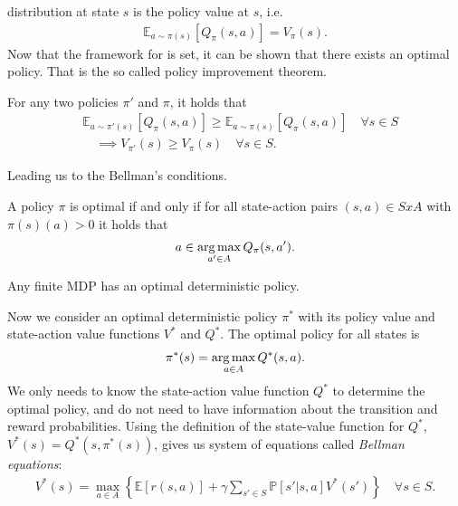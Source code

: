 distribution at state $s$ is the policy value at $s$, i.e.
\begin{align}
    \label{eq: state_value_expectation}
    \mathbb{E}_{a\sim\pi(s)}\left[Q_\pi(s, a)\right] = V_\pi(s).
\end{align}
Now that the framework for is set, it can be shown that there exists an
optimal policy. That is the so called policy improvement theorem.
\begin{theorem}
    For any two policies $\pi'$ and $\pi$, it holds that
    \begin{align}
         &\mathbb{E}_{a\sim\pi'(s)}\left[Q_\pi(s, a)\right]
        \ge \mathbb{E}_{a\sim\pi(s)}\left[Q_\pi(s, a)\right]  \quad \forall s \in S
        \\
         &\quad \implies  V_{\pi'}(s) \ge V_\pi (s) \quad
         \forall s \in S\nonumber.
    \end{align}
\end{theorem}
Leading us to the Bellman's conditions.
\begin{theorem}
    A policy $\pi$ is optimal if and only if for all state-action pairs
    $(s, a) \in S x A$ with $\pi(s)(a) > 0$ it holds that
    \begin{align}
        a \in \operatorname*{arg\,max}_{a'\in A} Q_\pi(s, a').
    \end{align}
\end{theorem}
\begin{theorem}
    Any finite MDP has an optimal deterministic policy.
\end{theorem}
Now we consider an optimal deterministic policy $\pi^{*}$ with its policy value and
state-action value functions $V^{*}$ and $Q^{*}$. The optimal policy for all
states is
\begin{align}
    \pi^{*}(s) = \operatorname*{arg\,max}_{a \in A} Q^{*}(s,a).
\end{align}
We only needs to know the state-action value function $Q^{*}$ to
determine the optimal policy, and do not need to have information about the
transition and reward probabilities. Using the definition of the state-value
function for $Q^{*}$, $V^{*}(s) = Q^{*}(s, \pi^{*}(s))$, gives us system of
equations called \textit{Bellman equations}:
\begin{align}
    V^{*}(s) = \max_{a\in A} \left\{ \mathbb{E}[r(s, a)] + \gamma\sum_{s'\in S}
    \mathbb{P}[s'|s,a] V^{*}(s') \right\} \quad \forall s \in S.
\end{align}
